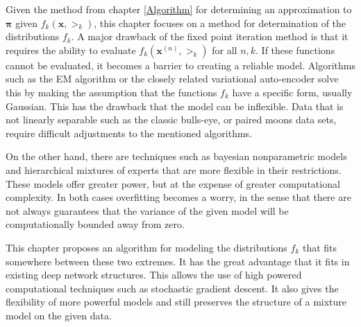 Given the method from chapter \ref{Algorithm} for determining an approximation to \( \bm\pi \) given \( f_k(\bm x,\bm\gt_k) \), this chapter focuses on a method for determination of the distributions \( f_k \). A major drawback of the fixed point iteration method is that it requires the ability to evaluate $f_k(\bm x^{(n)},\bm\gt_k)$ for all $n,k$.  If these functions cannot be evaluated, it becomes a barrier to creating a reliable model.  Algorithms such as the EM algorithm or the closely related variational auto-encoder \cite{kingma2013auto,van2017neural} solve this by making the assumption that the functions $f_k$ have a specific form, usually Gaussian. This has the drawback that the model can be inflexible. Data that is not linearly separable such as the classic bulls-eye, or paired moons data sets, require difficult adjustments to the mentioned algorithms.

On the other hand, there are techniques such as bayesian nonparametric models and
hierarchical mixtures of experts that are more flexible in their restrictions.  These
models offer greater power, but at the expense of greater computational complexity.  In
both cases overfitting becomes a worry, in the sense that there are not always guarantees that 
the variance of the given model will be computationally bounded away from zero.

This chapter proposes an algorithm for modeling the distributions $f_k$ that fits somewhere between these two
extremes. It has the great advantage that it fits in existing deep network structures. 
This allows the use of high powered computational techniques such as stochastic gradient
descent. It also gives the flexibility of more powerful models and still preserves
the structure of a mixture model on the given data.

